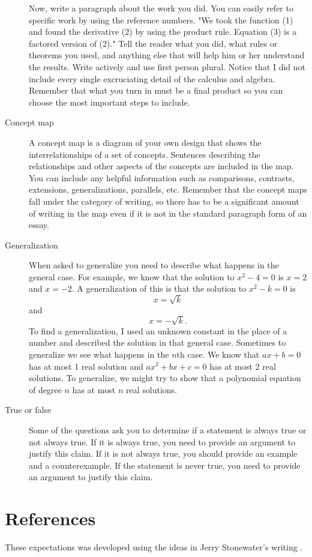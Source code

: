 \begin{description}
Now, write a paragraph about the work you did.  You can easily refer to specific work by using the reference numbers.  "We took the function (1) and found the derivative (2) by using the product rule.  Equation (3) is a factored version of (2)."  Tell the reader what you did, what rules or theorems you used, and anything else that will help him or her understand the results.  Write actively and use first person plural.  Notice that I did not include every single excruciating detail of the calculus and algebra.  Remember that what you turn in must be a final product so you can choose the most important steps to include.
\item[Concept map]  A concept map is a diagram of your own design that shows the interrelationships of a set of concepts.  Sentences describing the relationships and other aspects of the concepts are included in the map.  You can include any helpful information such as comparisons, contrasts, extensions, generalizations, parallels, etc.  Remember that the concept maps fall under the category of writing, so there has to be a significant amount of writing in the map even if it is not in the standard paragraph form of an essay.
\item[Generalization]  When asked to generalize you need to describe what happens in the general case.  For example, we know that the solution to $x^2 - 4 = 0$ is $x = 2$ and $x = -2$.  A generalization of this is that the solution to $x^2 - k = 0$ is $$
x = \sqrt k 
$$
 and $$
x =  - \sqrt k 
.$$
  To find a generalization, I used an unknown constant in the place of a number and described the solution in that general case.  Sometimes to generalize we see what happens in the $n$th case.  We know that 
$ax + b = 0$ has at most 1 real solution and $ax^2 + bx + c = 0$ has at most 2 real solutions.  To generalize, we might try to show that a polynomial equation of degree $n$ has at most $n$ real solutions.
\item [True or false]  Some of the questions ask you to determine if a statement is always true or not always true.  If it is always true, you need to provide an argument to justify this claim.  If it is not always true, you should provide an example and a counterexample.  If the statement is never true, you need to provide an argument to justify this claim.
\end{description}

 \section{References}

These expectations was developed using the ideas in Jerry Stonewater's writing \cite{SJ}.
  
